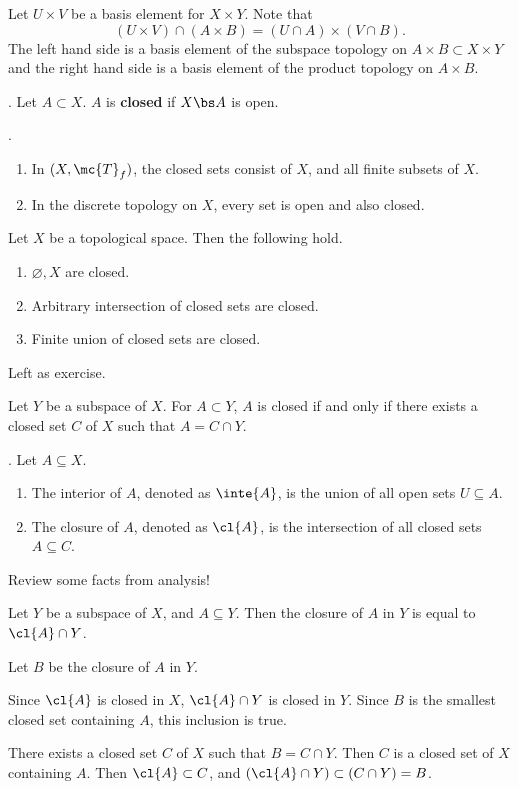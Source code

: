 \pf Let \(U \times V\) be a basis element for \(X \times Y\). Note that
\[
    (U\times V) \cap (A \times B) = (U\cap A) \times (V \cap B).
\]
The left hand side is a basis element of the subspace topology on \(A \times B \subset X \times Y\) and the right hand side is a basis element of the product topology on \(A \times B\).


.  Let \(A \subset X\). \(A\) is \textbf{closed} if \(X \bs A\) is open.

\ex.
\begin{enumerate}
    \item In \((X, \mc{T}_f)\), the closed sets consist of \(X\), and all finite subsets of \(X\).
    \item In the discrete topology on \(X\), every set is open and also closed.
\end{enumerate}

 Let \(X\) be a topological space. Then the following hold.
\begin{enumerate}
    \item \(\varnothing, X\) are closed.
    \item Arbitrary intersection of closed sets are closed.
    \item Finite union of closed sets are closed.
\end{enumerate}

\pf Left as exercise.

 Let \(Y\) be a subspace of \(X\). For \(A \subset Y\), \(A\) is closed if and only if there exists a closed set \(C\) of \(X\) such that \(A = C \cap Y\).

.  Let \(A \subseteq X\).
\begin{enumerate}
    \item The interior of \(A\), denoted as \(\inte{A}\), is the union of all open sets \(U \subseteq A\).
    \item The closure of \(A\), denoted as \(\cl{A}\), is the intersection of all closed sets \(A \subseteq C\).
\end{enumerate}

Review some facts from analysis!

 Let \(Y\) be a subspace of \(X\), and \(A \subseteq Y\). Then the closure of \(A\) in \(Y\) is equal to \(\cl{A} \cap Y\).

\pf Let \(B\) be the closure of \(A\) in \(Y\).

\note{\(\subset\)} Since \(\cl{A}\) is closed in \(X\), \(\cl{A} \cap Y\) is closed in \(Y\). Since \(B\) is the smallest closed set containing \(A\), this inclusion is true.

\note{\(\supset\)} There exists a closed set \(C\) of \(X\) such that \(B = C \cap Y\). Then \(C\) is a closed set of \(X\) containing \(A\). Then \(\cl{A} \subset C\), and \((\cl{A} \cap Y) \subset (C \cap Y) = B\).

\pagebreak
